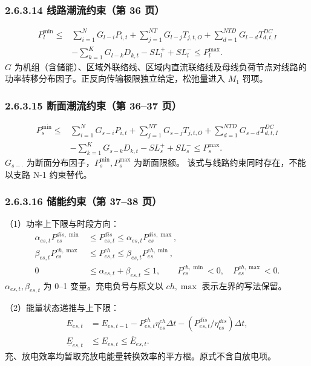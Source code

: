 \subsubsection{2.6.3.14 线路潮流约束（第 36 页）}
\begin{equation}
\begin{aligned}
 P_l^{\min}\le{}&\sum_{i=1}^{N}G_{l-i}P_{i,t}
 +\sum_{j=1}^{NT}G_{l-j}T_{j,t,O}
 +\sum_{d=1}^{NTD}G_{l-d}T^{DC}_{d,t,I}\\
 &-\sum_{k=1}^{K}G_{l-k}D_{k,t}-SL_l^++SL_l^-\le P_l^{\max}.
\end{aligned}
\end{equation}
$G$ 为机组（含储能）、区域外联络线、区域内直流联络线及母线负荷节点对线路的
功率转移分布因子。正反向传输极限独立给定，松弛量进入 $M_1$ 罚项。

\subsubsection{2.6.3.15 断面潮流约束（第 36--37 页）}
\begin{equation}
\begin{aligned}
 P_s^{\min}\le{}&\sum_{i=1}^{N}G_{s-i}P_{i,t}
 +\sum_{j=1}^{NT}G_{s-j}T_{j,t,O}
 +\sum_{d=1}^{NTD}G_{s-d}T^{DC}_{d,t,I}\\
 &-\sum_{k=1}^{K}G_{s-k}D_{k,t}-SL_s^++SL_s^-\le P_s^{\max}.
\end{aligned}
\end{equation}
$G_{s-\cdot}$ 为断面分布因子，$P_s^{\min},P_s^{\max}$ 为断面限额。
该式与线路约束同时存在，不能以支路 N-1 约束替代。

\subsubsection{2.6.3.16 储能约束（第 37--38 页）}
（1）功率上下限与时段方向：
\begin{align}
 \alpha_{es,t}P^{dis,\min}_{es}&\le P^{dis}_{es,t}\le\alpha_{es,t}P^{dis,\max}_{es},\\
 \beta_{es,t}P^{ch,\max}_{es}&\le P^{ch}_{es,t}\le\beta_{es,t}P^{ch,\min}_{es},\\
 0&\le\alpha_{es,t}+\beta_{es,t}\le1,\qquad
 P^{ch,\min}_{es}<0,\quad P^{ch,\max}_{es}<0.
\end{align}
$\alpha_{es,t},\beta_{es,t}$ 为 0--1 变量。充电负号与原文以 $ch,\max$ 表示左界的写法保留。

（2）能量状态递推与上下限：
\begin{align}
 E_{es,t}&=E_{es,t-1}-P^{ch}_{es,t}\eta^{ch}_{es}\Delta t
                   -(P^{dis}_{es,t}/\eta^{dis}_{es})\Delta t,\\
 \underline E_{es,t}&\le E_{es,t}\le\overline E_{es,t}.
\end{align}
充、放电效率均暂取充放电能量转换效率的平方根。原式不含自放电项。

